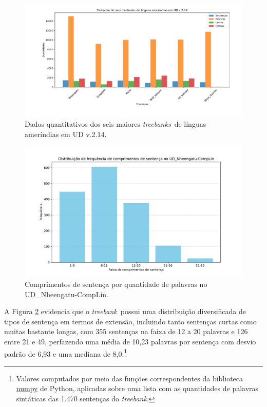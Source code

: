 \documentclass[portuguese]{textolivre}
\newcommand{\tbc}{UD\_Nheengatu-CompLin}
\newcommand{\tbs}{\textit{treebanks}}
\newcommand{\tb}{\textit{treebank}}
\begin{document}
\begin{figure}[htbp]
  \centering
  \begin{minipage}{.9\textwidth}
    \includegraphics[width=\linewidth]{figures/TreebankSizeStats.pdf}
    \caption{Dados quantitativos dos seis maiores \tbs~de línguas ameríndias em UD v.2.14.}
    \label{fig:size-stats}
  \end{minipage}
\end{figure}

\begin{figure}[htbp]
  \centering
  \begin{minipage}{.75\textwidth}
    \includegraphics[width=\linewidth]{figures/SentLensNheenRangesPor.pdf}
    \caption{Comprimentos de sentença por quantidade de palavras no \tbc.}
    \label{fig:comprimentos}
  \end{minipage}
\end{figure}

A Figura \ref{fig:comprimentos} evidencia que o \tb~possui uma distribuição diversificada de tipos de sentença em termos de extensão, incluindo tanto sentenças curtas como muitas bastante longas, com 355 sentenças na faixa de 12 a 20 palavras e 126 entre 21 e 49, perfazendo uma média de 10,23 palavras por sentença com desvio padrão de 6,93 e uma mediana de 8,0.\footnote{Valores computados por meio das funções correspondentes da biblioteca \href{https://numpy.org/}{numpy} de Python, aplicadas sobre uma lista com as quantidades de palavras sintáticas das 1.470 sentenças do \tb.}
\end{document}
